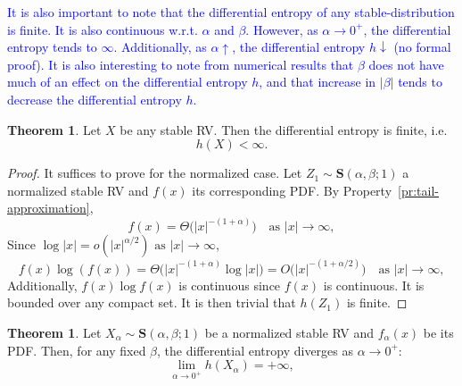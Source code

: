 \documentclass{article}
\theoremstyle{definition}
\newtheorem{theorem}[definition]{Theorem}
\begin{document}
\textcolor{blue}{It is also important to note that the differential entropy of any stable-distribution is finite. It is also continuous w.r.t. \(\alpha\) and \(\beta\). However, as \(\alpha\to0^+\), the differential entropy tends  to \(\infty\). Additionally, as \(\alpha\uparrow\), the differential entropy \(h\downarrow\) (no formal proof). It is also interesting to note from numerical results that \(\beta\) does not have much of an effect on the differential entropy \(h\), and that increase in \(|\beta|\) tends to decrease the differential entropy \(h\).}

\begin{theorem}
Let \(X\) be any stable RV.
Then the differential entropy is finite, i.e.
\[
h(X)<\infty.
\]
\end{theorem}

\begin{proof}
It suffices to prove for the normalized case.
Let \(Z_1\sim\mathbf{S}(\alpha,\beta;1)\) a normalized stable RV and \(f(x)\) its corresponding PDF. By Property~\ref{pr:tail-approximation},
\[
f(x) = \Theta\bigl(|x|^{-(1+\alpha)}\bigr)
\quad \text{as } |x|\to\infty,
\]
Since \(\log|x|=o(|x|^{\alpha/2}) \text{ as } |x|\to\infty\),
\[
f(x) \log(f(x)) = \Theta\bigl(|x|^{-(1+\alpha)}\log|x|\bigr) = O\bigl(|x|^{-(1+\alpha/2)}\bigr)
\quad \text{as } |x|\to\infty,
\]
Additionally, \(f(x)\log f(x)\) is continuous since \(f(x)\) is continuous. It is bounded over any compact set. It is then trivial that \(h(Z_1)\) is finite.
\end{proof}

\begin{theorem}
Let \(X_\alpha \sim \mathbf{S}(\alpha, \beta; 1)\) be a normalized stable RV and \(f_\alpha(x)\) be its PDF. Then, for any fixed \(\beta\), the differential entropy diverges as \(\alpha \to 0^+\):
\[
\lim_{\alpha \to 0^+} h(X_\alpha) = +\infty,
\]
\end{theorem}
\end{document}
